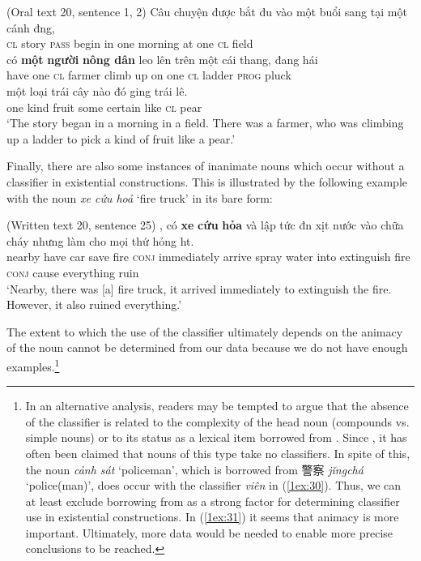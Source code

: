 \documentclass[output=paper]{langsci/langscibook}
\begin{document}
\begin{exe}
\ex\label{1ex:32}
(Oral text 20, sentence 1, 2)
\exi{}
\gll Câu  chuyện  được     {bắt đ{\daab}u}  vào  một   {buổi sang}   tại  một  cánh đ{\daob}ng, \\
{\textsc{cl}}    story     {\textsc{pass}}   begin      in    one   morning     at    one  {\textsc{cl}}  field \\
\glt 
\exi{} 
\gll có     {\textbf{một}} {\textbf{người}} {\textbf{nông dân}} leo      lên trên một cái thang,   đang     hái   \\
have one  {\textsc{cl}}      farmer      climb up  on    one {\textsc{cl}} ladder  {\textsc{prog}}  pluck \\
\glt
\exi{}
\gll một  loại  {trái cây}  nào đó            gi{\dao}ng  trái  lê. \\
one  kind  fruit      some certain   like     {\textsc{cl}}   pear \\
\glt `The story began in a morning in a field. There was a farmer, who was climbing up a ladder to pick a kind of fruit like a pear.'
\end{exe}

Finally, there are also some instances of inanimate nouns which occur without a classifier in existential constructions. This is illustrated by the following example with the noun {\emph{xe cứu hoả}} `fire truck' in its bare form:

\begin{exe}
\ex\label{1ex:33}
(Written text 20, sentence 25)
\exi{}
,  có   {\textbf{xe}}  {\textbf{cứu}}  {\textbf{hỏa}}   và        {lập tức}           đ{\dae}n      xịt     nước  vào  chữa cháy nhưng  {làm cho}  {mọi thứ}       {hỏng h{\dae}t}.\\
nearby  have car save fire    {\textsc{conj}}  immediately  arrive  spray water into extinguish fire {\textsc{conj}}  cause      everything  ruin \\
\glt `Nearby, there was [a] fire truck, it arrived immediately to extinguish the fire. However, it also ruined everything.'
\end{exe}

The extent to which the use of the classifier ultimately depends on the animacy of the noun cannot be determined from our data because we do not have enough examples.\footnote{In an alternative analysis, readers may be tempted to argue that the absence of the classifier is related to the complexity of the head noun (compounds vs. simple nouns) or to its status as a lexical item borrowed from . Since \cite{emeneau:51}, it has often been claimed that nouns of this type take no classifiers. In spite of this, the noun {\emph{cảnh sát}} `policeman', which is borrowed from 
{\cn 警察}
{\emph{jǐngchá}} `police(man)', does occur with the classifier {\emph{viên}} in (\ref{1ex:30}). Thus, we can at least exclude borrowing from  as a strong factor for determining classifier use in existential constructions. In (\ref{1ex:31}) it seems that animacy is more important. Ultimately, more data would be needed to enable more precise conclusions to be reached.}
\end{document}
